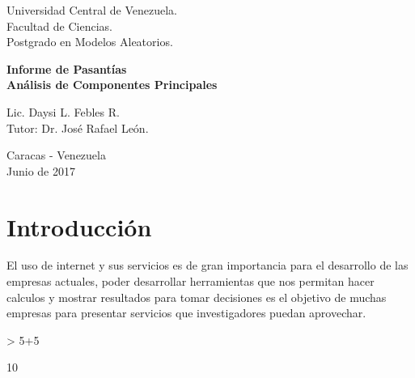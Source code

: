 \documentclass[12pt,letterpaper]{report} %
\begin{document}


\thispagestyle{empty}
\thispagestyle{empty}

\enlargethispage{3cm}

\pagestyle{empty}


\begin{center}
\large
Universidad Central de Venezuela. \\
Facultad de Ciencias.\\
Postgrado en Modelos Aleatorios.\\
\end{center}
\vspace{1cm}

\vspace{0.8cm}

\begin{center}
\large{\bf Informe de Pasantías\\ Análisis de Componentes Principales}
\end{center}

\vspace{3cm}

\begin{center}
\small
\parbox{11.5 cm}{
\begin{center}
Lic. Daysi L. Febles R.\\
Tutor: Dr. Jos\'e Rafael Le\'on. \end{center} }
\end{center}

\vspace{2cm}

\begin{center}
Caracas - Venezuela\\ Junio de 2017
\end{center}

\newpage

\chapter{Introducción}

El uso de internet y sus servicios es de gran importancia para el desarrollo de las empresas actuales, poder desarrollar herramientas que nos permitan hacer calculos y mostrar resultados para tomar decisiones es el objetivo de muchas empresas para presentar servicios que investigadores puedan aprovechar.


\begin{Schunk}
\begin{Sinput}
> 5+5
\end{Sinput}
\begin{Soutput}
[1] 10
\end{Soutput}
\end{Schunk}
\end{document}
